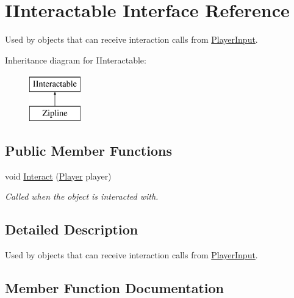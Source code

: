 \hypertarget{interface_i_interactable}{}\section{I\+Interactable Interface Reference}
\label{interface_i_interactable}


Used by objects that can receive interaction calls from \hyperlink{class_player_input}{Player\+Input}.  


Inheritance diagram for I\+Interactable\+:\begin{figure}[H]
\begin{center}
\leavevmode
\includegraphics[height=2.000000cm]{interface_i_interactable}
\end{center}
\end{figure}
\subsection*{Public Member Functions}
\begin{DoxyCompactItemize}
\item 
void \hyperlink{interface_i_interactable_a736e28381ac0e7ca60f5fae2feb95afe}{Interact} (\hyperlink{class_player}{Player} player)
\begin{DoxyCompactList}\small\item\em Called when the object is interacted with. \end{DoxyCompactList}\end{DoxyCompactItemize}


\subsection{Detailed Description}
Used by objects that can receive interaction calls from \hyperlink{class_player_input}{Player\+Input}. 



\subsection{Member Function Documentation}
\hypertarget{interface_i_interactable_a736e28381ac0e7ca60f5fae2feb95afe}{}\label{interface_i_interactable_a736e28381ac0e7ca60f5fae2feb95afe} 
